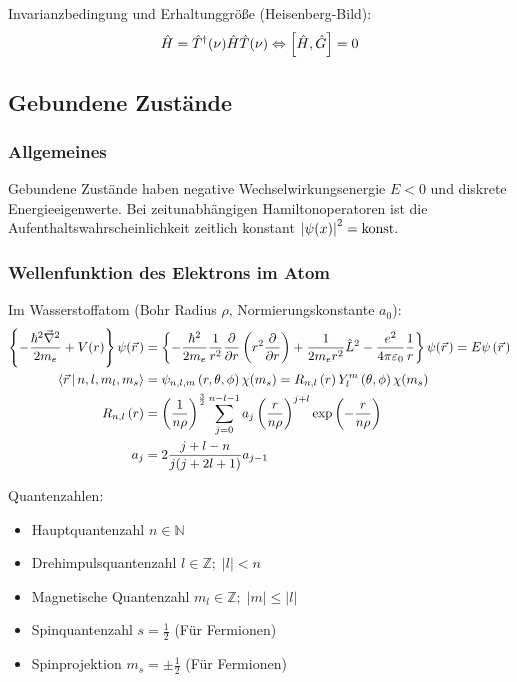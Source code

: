 			\noindent
			Invarianzbedingung und Erhaltunggröße (Heisenberg-Bild):
			\begin{equation}
				\hat{H} =\hat{T}^\dagger(\nu)\hat{H} \hat{T}(\nu) \Leftrightarrow \left[\hat{H},\hat{G}\right] = 0
			\end{equation}

	\subsection{Gebundene Zustände}
		\subsubsection{Allgemeines}
			\noindent
			Gebundene Zustände haben negative Wechselwirkungsenergie $E<0$ und diskrete Energieeigenwerte. Bei zeitunabhängigen Hamiltonoperatoren ist die Aufenthaltswahrscheinlichkeit zeitlich konstant $\left|\psi(x)\right|^2=\mathrm{konst.}$

		\subsubsection{Wellenfunktion des Elektrons im Atom}
			\noindent
			Im Wasserstoffatom (Bohr Radius $\rho$, Normierungskonstante $a_0$):
			\begin{equation}
				\begin{aligned}
					\cBr{-\frac{\hbar^2 \Nabla^2}{2 m_e} + V(r)}\psi(\pvec{r})
					&= \cBr{-\frac{\hbar^2}{2 m_e}\frac{1}{r^2}\pder{}{r}\Br{r^2\pder{}{r}} + \frac{1}{2 m_e r^2} \hat{L}^2 - \frac{e^2}{4\pi\varepsilon_0}\frac{1}{r}}\psi(\pvec{r})
					= E \psi\Br{\pvec{r}}
					\\
					\Braket{\vec{r}|n,l,m_l,m_s} &= \psi_{n,l,m}\left(r,\theta,\phi\right)\chi(m_s)
					= R_{n,l}\left(r\right) Y_l^m\left(\theta,\phi\right)\chi(m_s) \\
					R_{n,l}\left(r\right)
					&= \left(\frac{1}{n\rho}\right)^{\frac{3}{2}}
					\sum_{j=0}^{n-l-1} a_j \left(\frac{r}{n\rho}\right)^{j+l} \exp\left({-\frac{r}{n\rho}}\right) \\
					a_j &= 2\frac{j+l-n}{j(j+2l+1)} a_{j-1} \\
				\end{aligned}
			\end{equation}

			\noindent
			Quantenzahlen:
			\begin{itemize}
				\item Hauptquantenzahl $n \in \mathbb{N}$
				\item Drehimpulsquantenzahl $l \in \mathbb{Z};\; \left|l\right| < n$
				\item Magnetische Quantenzahl $m_l \in \mathbb{Z};\; \left|m\right| \le \left|l\right|$
				\item Spinquantenzahl $s = \frac{1}{2}$ (Für Fermionen)
				\item Spinprojektion $m_s = \pm \frac{1}{2}$ (Für Fermionen)
			\end{itemize}

